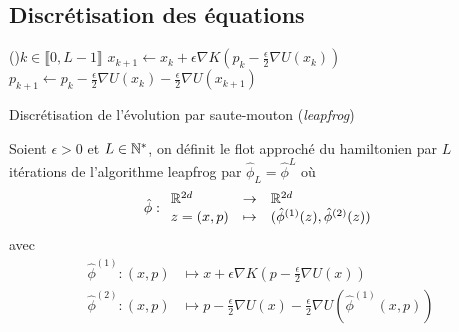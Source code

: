 \documentclass[10pt,a4paper]{article}
\begin{document}
\subsection{Discrétisation des équations}




\begin{center}
	\begin{algorithm}[H]
		\For(){$k \in \llbracket 0, L-1 \rrbracket$}{
			$x_{k+1} \leftarrow x_k + \epsilon \nabla K \left( p_k - \frac{\epsilon}{2} \nabla U(x_k) \right)$\;
			$p_{k+1} \leftarrow p_k - \frac{\epsilon}{2} \nabla U(x_k) - \frac{\epsilon}{2} \nabla U(x_{k+1})$\;
		}
		\caption{Discrétisation de l'évolution par saute-mouton (\emph{leapfrog})}
		\label{algo:leapfrog}
	\end{algorithm}
\end{center}

\begin{Def} Soient $\epsilon > 0$ et $L \in \mathbb{N}^*$, on définit le flot approché du hamiltonien par $L$ itérations de l'algorithme leapfrog par $\hat{\phi}_L = \hat{\phi}^L$ où 
  $$
  \hat{\phi} : { \begin{array}{lcl} \mathbb{R}^{2d} & \to & \mathbb{R}^{2d} \\
    z = (x, p) & \mapsto & (\hat{\phi}^{(1)}(z), \hat{\phi}^{(2)}(z))
     \end{array} }
  $$
  avec
  \begin{align*}
    \hat{\phi}^{(1)} : (x,p) & \mapsto x + \epsilon \nabla K \left( p - \frac{\epsilon}{2} \nabla U(x) \right) \\
    \hat{\phi}^{(2)} : (x,p) & \mapsto p - \frac{\epsilon}{2} \nabla U(x) - \frac{\epsilon}{2} \nabla U(\hat{\phi}^{(1)}(x,p))
  \end{align*}
\end{Def}
\end{document}
